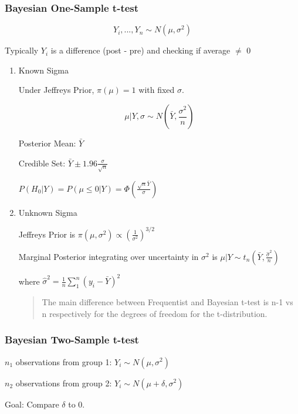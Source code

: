 \documentclass[11pt]{article}
\begin{document}
\subsubsection{Bayesian One-Sample t-test}
\label{sec:org403498e}

$$
Y_i, ..., Y_n \sim N(\mu, \sigma^2)
$$

Typically \(Y_i\) is a difference (post - pre) and checking if average \(\neq\) 0


\begin{enumerate}
\item Known Sigma
\label{sec:org5a1729e}

Under Jeffreys Prior, \(\pi(\mu) = 1\) with fixed \(\sigma\).

$$
\mu | Y, \sigma \sim N (\bar Y, \frac{\sigma^2}{n})
$$

Posterior Mean: \(\bar Y\)

Credible Set: \(\bar Y \pm 1.96 \frac{\sigma}{\sqrt n}\)

\(P(H_0 | Y) = P(\mu \leq 0 | Y) = \Phi \left( \frac{\sqrt n \bar Y}{\sigma} \right)\)

\item Unknown Sigma
\label{sec:org347fa69}

Jeffreys Prior is \(\pi (\mu, \sigma^2) \propto \left( \frac{1}{\sigma^2} \right)^{3/2}\)

Marginal Posterior integrating over uncertainty in \(\sigma^2\) is \(\mu | Y \sim
t_n (\bar Y,\frac{\hat \sigma^2}{n})\)

where \(\hat \sigma^2 = \frac{1}{n} \sum_{1}^{n}(y_i - \bar Y)^2\)

\begin{quote}
The main difference between Frequentist and Bayesian t-test is n-1 vs n
respectively for the degrees of freedom for the t-distribution.
\end{quote}
\end{enumerate}

\subsubsection{Bayesian Two-Sample t-test}
\label{sec:org07c1f05}

\(n_1\) observations from group 1: \(Y_i \sim N (\mu, \sigma^2)\)


\(n_2\) observations from group 2: \(Y_i \sim N (\mu + \delta, \sigma^2)\)

Goal: Compare \(\delta\) to 0.
\end{document}

